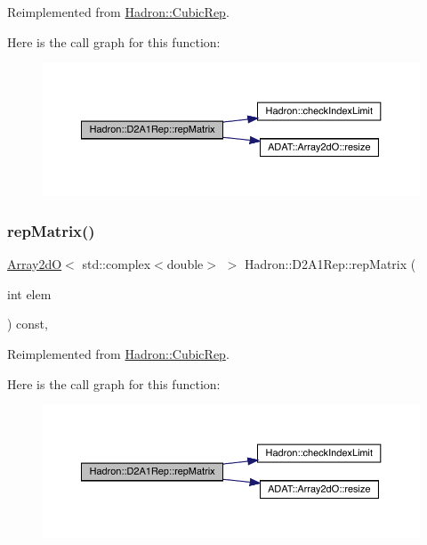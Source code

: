 Reimplemented from \mbox{\hyperlink{structHadron_1_1CubicRep_ac5d7e9e6f4ab1158b5fce3e4ad9e8005}{Hadron\+::\+Cubic\+Rep}}.

Here is the call graph for this function\+:
\nopagebreak
\begin{figure}[H]
\begin{center}
\leavevmode
\includegraphics[width=350pt]{d5/d28/structHadron_1_1D2A1Rep_a0d9bec731ada6fec10956dce667b2ffd_cgraph}
\end{center}
\end{figure}
\mbox{\label{structHadron_1_1D2A1Rep_a0d9bec731ada6fec10956dce667b2ffd}} 
\subsubsection{\texorpdfstring{repMatrix()}{repMatrix()}\hspace{0.1cm}{\footnotesize\ttfamily [3/3]}}
{\footnotesize\ttfamily \mbox{\hyperlink{classADAT_1_1Array2dO}{Array2dO}}$<$ std\+::complex$<$double$>$ $>$ Hadron\+::\+D2\+A1\+Rep\+::rep\+Matrix (\begin{DoxyParamCaption}\item[{int}]{elem }\end{DoxyParamCaption}) const\hspace{0.3cm}{\ttfamily [inline]}, {\ttfamily [virtual]}}



Reimplemented from \mbox{\hyperlink{structHadron_1_1CubicRep_ac5d7e9e6f4ab1158b5fce3e4ad9e8005}{Hadron\+::\+Cubic\+Rep}}.

Here is the call graph for this function\+:
\nopagebreak
\begin{figure}[H]
\begin{center}
\leavevmode
\includegraphics[width=350pt]{d5/d28/structHadron_1_1D2A1Rep_a0d9bec731ada6fec10956dce667b2ffd_cgraph}
\end{center}
\end{figure}



